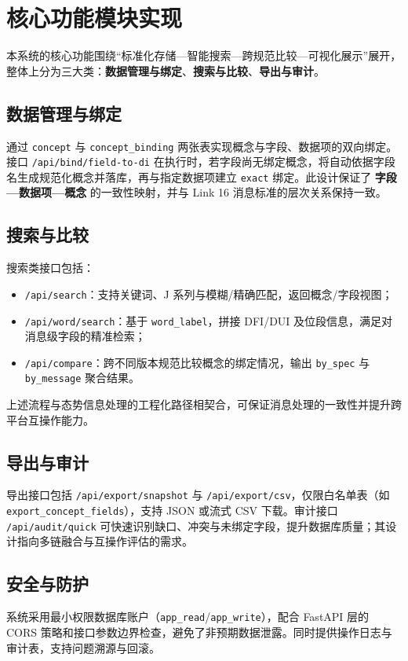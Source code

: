 \section{核心功能模块实现}

本系统的核心功能围绕“标准化存储—智能搜索—跨规范比较—可视化展示”展开，整体上分为三大类：\textbf{数据管理与绑定}、\textbf{搜索与比较}、\textbf{导出与审计}。

\subsection{数据管理与绑定}
通过 \texttt{concept} 与 \texttt{concept\_binding} 两张表实现概念与字段、数据项的双向绑定。接口 \texttt{/api/bind/field-to-di} 在执行时，若字段尚无绑定概念，将自动依据字段名生成规范化概念并落库，再与指定数据项建立 \texttt{exact} 绑定。此设计保证了 \textbf{字段—数据项—概念} 的一致性映射，并与 {Link 16} 消息标准的层次关系保持一致。

\subsection{搜索与比较}
搜索类接口包括：
\begin{itemize}
  \item \texttt{/api/search}：支持关键词、J 系列与模糊/精确匹配，返回概念/字段视图；
  \item \texttt{/api/word/search}：基于 \texttt{word\_label}，拼接 DFI/DUI 及位段信息，满足对消息级字段的精准检索；
  \item \texttt{/api/compare}：跨不同版本规范比较概念的绑定情况，输出 \texttt{by\_spec} 与 \texttt{by\_message} 聚合结果。
\end{itemize}

上述流程与态势信息处理的工程化路径相契合，可保证消息处理的一致性并提升跨平台互操作能力。

\subsection{导出与审计}
导出接口包括 \texttt{/api/export/snapshot} 与 \texttt{/api/export/csv}，仅限白名单表（如 \texttt{export\_concept\_fields}），支持 JSON 或流式 CSV 下载。审计接口 \texttt{/api/audit/quick} 可快速识别缺口、冲突与未绑定字段，提升数据库质量；其设计指向多链融合与互操作评估的需求。

\subsection{安全与防护}
系统采用最小权限数据库账户（\texttt{app\_read}/\texttt{app\_write}），配合 FastAPI 层的 CORS 策略和接口参数边界检查，避免了非预期数据泄露。同时提供操作日志与审计表，支持问题溯源与回滚。

